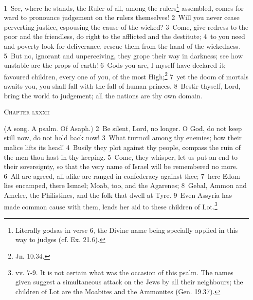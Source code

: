 \documentclass[10pt]{book} %
\begin{document}
\textcolor{benred8}{1}~See, where he stands, the Ruler of all, among the rulers\footnote[1]{Literally \textasciigrave gods\textquotesingle  as in verse 6, the Divine name being specially applied in this way to judges (cf. Ex. 21.6).} assembled, comes for-ward to pronounce judgement on the rulers themselves! \textcolor{benred8}{2}~Will you never cease perverting justice, espousing the cause of the wicked? \textcolor{benred8}{3}~Come, give redress to the poor and the friendless, do right to the afflicted and the destitute; \textcolor{benred8}{4}~to you need and poverty look for deliverance, rescue them from the hand of the wickedness. \textcolor{benred8}{5}~But no, ignorant and unperceiving, they grope their way in darkness; see how unstable are the props of earth! \textcolor{benred8}{6}~Gods you are, I myself have declared it; favoured children, every one of you, of the most High;\footnote[2]{Jn. 10.34.} \textcolor{benred8}{7}~yet the doom of mortals awaits you, you shall fall with the fall of human princes. \textcolor{benred8}{8}~Bestir thyself, Lord, bring the world to judgement; all the nations are thy own domain.
\begin{large}\begin{center}\textsc{Chapter lxxxii}\end{center}\end{large}
(A song. A psalm. Of Asaph.)
\textcolor{benred8}{2}~Be silent, Lord, no longer. O God, do not keep still now, do not hold back now! \textcolor{benred8}{3}~What turmoil among thy enemies; how their malice lifts its head! \textcolor{benred8}{4}~Busily they plot against thy people, compass the ruin of the men thou hast in thy keeping. \textcolor{benred8}{5}~Come, they whisper, let us put an end to their sovereignty, so that the very name of Israel will be remembered no more. \textcolor{benred8}{6}~All are agreed, all alike are ranged in confederacy against thee; \textcolor{benred8}{7}~here Edom lies encamped, there Ismael; Moab, too, and the Agarenes; \textcolor{benred8}{8}~Gebal, Ammon and Amelec, the Philistines, and the folk that dwell at Tyre. \textcolor{benred8}{9}~Even Assyria has made common cause with them, lends her aid to these children of Lot.\footnote[1]{vv. 7-9. It is not certain what was the occasion of this psalm. The names given suggest a simultaneous attack on the Jews by all their neighbours; the children of Lot are the Moabites and the Ammonites (Gen. 19.37).}
\end{document}
